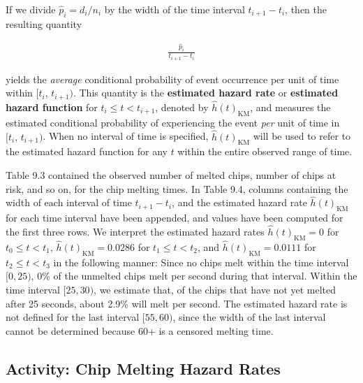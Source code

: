 \documentclass[
]{book}
\begin{document}
If we divide \(\hat p_i = d_i/n_i\) by the width of the time interval \(t_{i+1}-t_i\), then the resulting quantity

\begin{align}\label{9.15}
\frac{\hat p_i}{t_{i+1} - t_i}
\tag{9.15}
\end{align}

yields the \emph{average} conditional probability of event occurrence per unit of time within \([t_i,\,t_{i+1})\). This quantity is the \textbf{estimated hazard rate} or \textbf{estimated hazard function} for \(t_i \le t < t_{i+1}\), denoted by \(\hat h(t)_{\mathrm{KM}}\), and measures the estimated conditional probability of experiencing the event \emph{per} unit of time in \([t_i,\,t_{i+1})\). When no interval of time is specified, \(\hat h(t)_{\mathrm{KM}}\) will be used to refer to the estimated hazard function for any \(t\) within the entire observed range of time.

Table 9.3 contained the observed number of melted chips, number of chips at risk, and so on, for the chip melting times. In Table 9.4, columns containing the width of each interval of time \(t_{i+1} - t_i\), and the estimated hazard rate \(\hat h(t)_{\mathrm{KM}}\) for each time interval have been appended, and values have been computed for the first three rows. We interpret the estimated hazard rates \(\hat h(t)_{\mathrm{KM}} = 0\) for \(t_0 \le t < t_1\), \(\hat h(t)_{\mathrm{KM}} = 0.0286\) for \(t_1 \le t < t_2\), and \(\hat h(t)_{\mathrm{KM}} = 0.0111\) for \(t_2 \le t < t_3\) in the following manner: Since no chips melt within the time interval \([0,25)\), 0\% of the unmelted chips melt per second during that interval. Within the time interval \([25,30)\), we estimate that, of the chips that have not yet melted after 25 seconds, about 2.9\% will melt per second. The estimated hazard rate is not defined for the last interval \([55,60)\), since the width of the last interval cannot be determined because 60+ is a censored melting time.

\hypertarget{activity-chip-melting-hazard-rates}{%
\subsection*{Activity: Chip Melting Hazard Rates}\label{activity-chip-melting-hazard-rates}}
\end{document}
